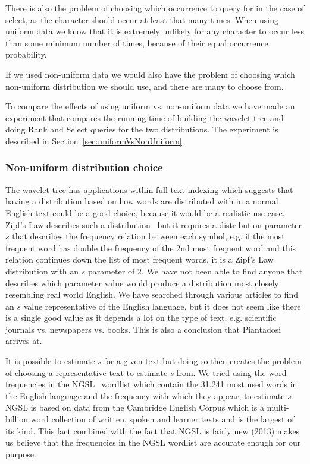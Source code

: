 There is also the problem of choosing which occurrence to query for in the case of select, as the character should occur at least that many times.
When using uniform data we know that it is extremely unlikely for any character to occur less than some minimum number of times, because of their equal occurrence probability.

If we used non-uniform data we would also have the problem of choosing which non-uniform distribution we should use, and there are many to choose from.

To compare the effects of using uniform vs. non-uniform data we have made an experiment that compares the running time of building the wavelet tree and doing Rank and Select queries for the two distributions. 
The experiment is described in Section~\ref{sec:uniformVsNonUniform}.

\subsubsection{Non-uniform distribution choice}
The wavelet tree has applications within full text indexing which suggests that having a distribution based on how words are distributed with in a normal English text could be a good choice, because it would be a realistic use case. 
Zipf's Law describes such a distribution~\citep[abstract]{ZipfsLawOnText} but it requires a distribution parameter $s$ that describes the frequency relation between each symbol, e.g. if the most frequent word has double the frequency of the 2nd most frequent word and this relation continues down the list of most frequent words, it is a Zipf's Law distribution with an $s$ parameter of 2.
We have not been able to find anyone that describes which parameter value would produce a distribution most closely resembling real world English. 
We have searched through various articles to find an $s$ value representative of the English language, but it does not seem like there is a single good value as it depends a lot on the type of text, e.g. scientific journals vs. newspapers vs. books.
This is also a conclusion that Piantadosi~\citep[abstract]{ZipfsLawOnText} arrives at.

It is possible to estimate \textit{s} for a given text but doing so then creates the problem of choosing a representative text to estimate \textit{s} from.
We tried using the word frequencies in the NGSL~\citep{NGSL} wordlist which contain the 31,241 most used words in the English language and the frequency with which they appear, to estimate \textit{s}.
NGSL is based on data from the Cambridge English Corpus which is a multi-billion word collection of written, spoken and learner texts and is the largest of its kind.
This fact combined with the fact that NGSL is fairly new (2013) makes us believe that the frequencies in the NGSL wordlist are accurate enough for our purpose.

